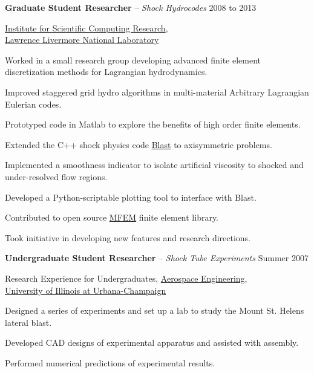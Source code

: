 \documentclass[10pt]{article}
\newenvironment{innerlist}[1][\enskip\textbullet]%
        {\begin{compactitem}[#1]}{\end{compactitem}}
\begin{document}
\textbf{Graduate Student Researcher} -- \emph{Shock Hydrocodes} \hfill {2008 to 2013}
\begin{innerlist}

\item[] \href{http://iscr.llnl.gov/}{Institute for Scientific Computing Research},\\
        \href{http://www.llnl.gov/}{Lawrence Livermore National Laboratory}
\begin{innerlist}
\item Worked in a small research group developing advanced finite element discretization methods for Lagrangian hydrodynamics.
\item Improved staggered grid hydro algorithms in multi-material Arbitrary Lagrangian Eulerian codes.
\item Prototyped code in Matlab to explore the benefits of high order finite elements.
\item Extended the C++ shock physics code \href{https://computation.llnl.gov/casc/blast/blast.html}{Blast} to axisymmetric problems.
\item Implemented a smoothness indicator to isolate artificial viscosity to shocked and under-resolved flow regions.
\item Developed a Python-scriptable plotting tool to interface with Blast.
\item Contributed to open source \href{http://www.mfem.org/}{MFEM} finite element library.
\item Took initiative in developing new features and research directions.
\end{innerlist}
\end{innerlist}

\bigskip
\pagebreak

\textbf{Undergraduate Student Researcher} -- \emph{Shock Tube Experiments} \hfill {Summer 2007}
\begin{innerlist}

\item[] {Research Experience for Undergraduates},
        \href{http://www.ae.uiuc.edu/}{Aerospace Engineering},\\
        \href{http://www.uiuc.edu/}{University of Illinois at Urbana-Champaign}
\begin{innerlist}
\item Designed a series of experiments and set up a lab to study the Mount St. Helens lateral blast.
\item Developed CAD designs of experimental apparatus and assisted with assembly.
\item Performed numerical predictions of experimental results.
\end{innerlist}
\end{innerlist}
\end{document}
